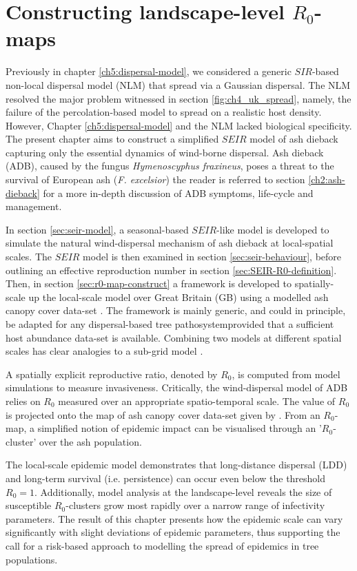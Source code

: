 \chapter{Constructing landscape-level $R_0$-maps}
\label{ch:6-adb}

Previously in chapter \ref{ch5:dispersal-model}, we considered a generic $SIR$-based non-local dispersal model (NLM) that spread via a Gaussian dispersal. 
The NLM resolved the major problem witnessed in section \ref{fig:ch4_uk_spread}, 
namely, the failure of the percolation-based model to spread on a realistic host density. 
However, Chapter \ref{ch5:dispersal-model} and the NLM lacked biological specificity.
The present chapter aims to construct a simplified $SEIR$ model of ash dieback capturing only the essential dynamics of wind-borne dispersal.
Ash dieback (ADB), caused by the fungus \textit{Hymenoscyphus fraxineus}, poses a threat to the survival of European ash (\textit{F. excelsior})\textemdash
the reader is referred to section \ref{ch2:ash-dieback} for a more in-depth discussion of ADB symptoms, life-cycle and management.

In section \ref{sec:seir-model}, a seasonal-based $SEIR$-like model is developed to simulate the natural wind-dispersal mechanism of ash dieback at local-spatial scales. 
The $SEIR$ model is then examined in section \ref{sec:seir-behaviour}, before outlining an effective reproduction number in section \ref{sec:SEIR-R0-definition}.
Then, in section \ref{sec:r0-map-construct} a framework is developed to spatially-scale up the local-scale model over Great Britain (GB) using a modelled ash canopy cover data-set \cite{hill.data}.
The framework is mainly generic, and could in principle, be adapted for any dispersal-based tree pathosystem\textemdash provided that a sufficient host abundance data-set is available.
Combining two models at different spatial scales has clear analogies to a sub-grid model \cite{sub-grid}.
 
A spatially explicit reproductive ratio, denoted by $R_0$, is computed from model simulations to measure invasiveness.
Critically, the wind-dispersal model of ADB relies on $R_0$  measured over an appropriate spatio-temporal scale.
The value of $R_0$ is projected onto the map of ash canopy cover data-set given by \cite{hill.data}.
From an $R_0$-map, a simplified notion of epidemic impact can be visualised through an '$R_0$-cluster' over the ash population.

The local-scale epidemic model demonstrates that long-distance dispersal (LDD) and long-term survival (i.e. persistence)  
can occur even below the threshold $R_0=1$.
Additionally, model analysis at the landscape-level reveals the size of susceptible $R_0$-clusters grow most rapidly over a narrow range of infectivity parameters.
The result of this chapter presents how the epidemic scale can vary significantly with slight deviations of epidemic parameters, 
thus supporting the call for a risk-based approach to modelling the spread of epidemics in tree populations.

